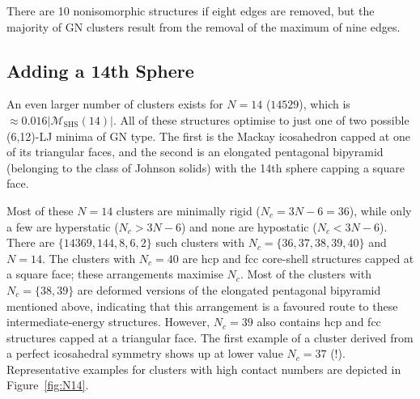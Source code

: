 There are 10 nonisomorphic structures if eight edges are removed, but the
majority of \ac{GN} clusters result from the removal of the maximum of nine
edges.


\subsection{Adding a 14th Sphere}
\label{sec:addinga14thsphere}

An even larger number of clusters exists for $N=14$ ($14529$), which is
$\approx 0.016|\mathcal{M}_\mathrm{SHS}(14)|$. All of these structures optimise
to just one of two possible (6,12)-LJ minima of \ac{GN} type. The first is the
Mackay icosahedron capped at one of its triangular faces, and the second is an
elongated pentagonal bipyramid (belonging to the class of Johnson solids) with
the 14th sphere capping a square face.

Most of these $N=14$ clusters are minimally rigid ($N_c=3N-6=36$), while only a
few are hyperstatic ($N_c > 3N-6$) and none are hypostatic ($N_c < 3N-6$).
There are $\{14369,144,8,6,2\}$ such clusters with $N_c=\{36,37,38,39,40\}$ and
$N=14$.  The clusters with $N_c=40$ are hcp and \ac{fcc} core-shell structures
capped at a square face; these arrangements maximise $N_c$. Most of the
clusters with $N_c=\{38,39\}$ are deformed versions of the elongated pentagonal
bipyramid mentioned above, indicating that this arrangement is a favoured route
to these intermediate-energy structures.  However, $N_c=39$ also contains hcp
and \ac{fcc} structures capped at a triangular face.  The first example of a cluster
derived from a perfect icosahedral symmetry shows up at lower value $N_c=37$
(!).  Representative examples for clusters with high contact numbers are
depicted in Figure~\ref{fig:N14}.  

